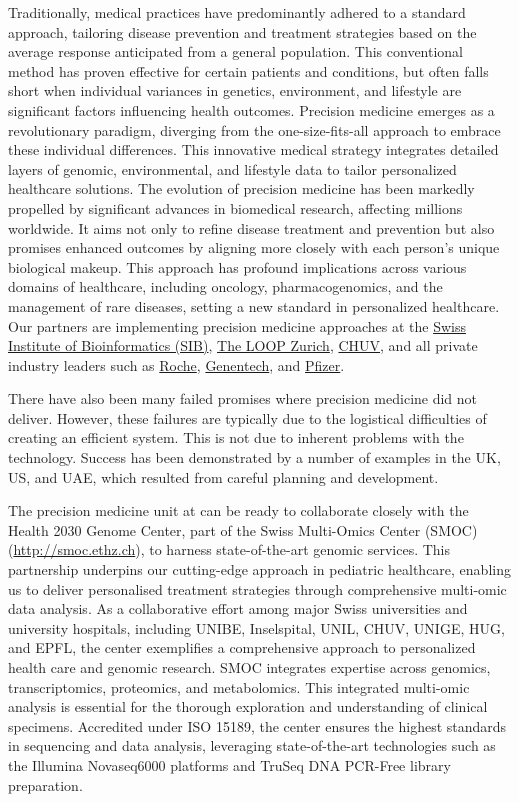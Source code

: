 Traditionally, medical practices have predominantly adhered to a standard approach, tailoring disease prevention and treatment strategies based on the average response anticipated from a general population. 
This conventional method has proven effective for certain patients and conditions, but often falls short when individual variances in genetics, environment, and lifestyle are significant factors influencing health outcomes. 
Precision medicine emerges as a revolutionary paradigm, diverging from the one-size-fits-all approach to embrace these individual differences. 
This innovative medical strategy integrates detailed layers of genomic, environmental, and lifestyle data to tailor personalized healthcare solutions. 
The evolution of precision medicine has been markedly propelled by significant advances in biomedical research, affecting millions worldwide. It aims not only to refine disease treatment and prevention but also promises enhanced outcomes by aligning more closely with each person's unique biological makeup. This approach has profound implications across various domains of healthcare, including oncology, pharmacogenomics, and the management of rare diseases, setting a new standard in personalized healthcare.
Our partners are implementing precision medicine approaches at
the 
\href{https://www.precisionmed.ch/en/}{Swiss Institute of Bioinformatics (SIB)},
\href{https://theloopzurich.ch/en/}{The LOOP Zurich},
\href{https://www.chuv.ch/en/bdsc/research/our-groups/precision-medicine}{CHUV}, 
and all  private industry leaders such as 
\href{https://www.roche.com/about/strategy/personalised-healthcare}{Roche},
\href{https://www.gene.com/topics/personalized-healthcare}{Genentech},
and \href{https://www.pfizer.com/science/innovation/precision-medicine}{Pfizer}.

There have also been many failed promises where precision medicine did not deliver.
However, these failures are typically due to the logistical difficulties of creating an efficient system.
This is not due to inherent problems with the technology. 
Success has been demonstrated by a number of examples in the UK, US, and UAE, which resulted from careful planning and development.

The precision medicine unit at \kispi can be ready to collaborate closely with the Health 2030 Genome Center, part of the Swiss Multi-Omics Center (SMOC) (\url{http://smoc.ethz.ch}), to harness state-of-the-art genomic services. 
This partnership underpins our cutting-edge approach in pediatric healthcare, enabling us to deliver personalised treatment strategies through comprehensive multi-omic data analysis.
As a collaborative effort among major Swiss universities and university hospitals, including UNIBE, Inselspital, UNIL, CHUV, UNIGE, HUG, and EPFL, the center exemplifies a comprehensive approach to personalized health care and genomic research.
SMOC integrates expertise across genomics, transcriptomics, proteomics, and metabolomics. This integrated multi-omic analysis is essential for the thorough exploration and understanding of clinical specimens. Accredited under ISO 15189, the center ensures the highest standards in sequencing and data analysis, leveraging state-of-the-art technologies such as the Illumina Novaseq6000 platforms and TruSeq DNA PCR-Free library preparation.


